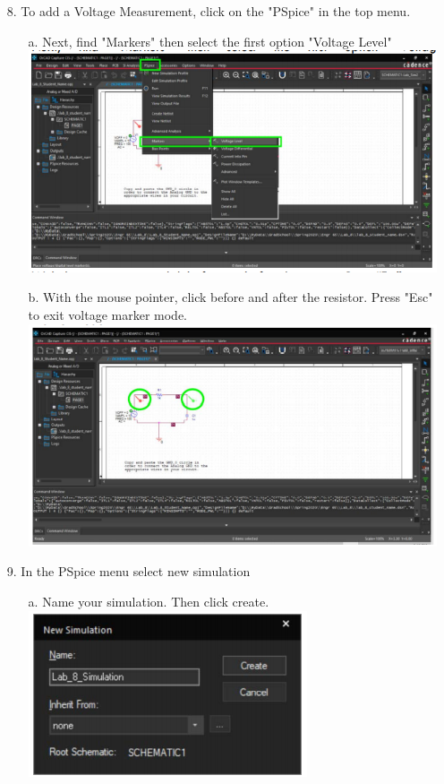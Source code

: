 \documentclass[a4paper]{article}
\begin{document}
\begin{itemize}
  \item[8.] To add a Voltage Measurement, click on the "PSpice" in the top menu.
  \begin{itemize}
    \item[a.] Next, find "Markers" then select the first option "Voltage Level" \\
    \includegraphics[scale=0.5]{12.png} \\ 
    \item[b.] With the mouse pointer, click before and after the resistor. Press "Esc" to exit voltage marker mode. \\
    \includegraphics[scale=0.5]{13.png} \\ 
  \end{itemize} 
  \item[9.] In the PSpice menu select new simulation
  \begin{itemize}
    \item[a.] Name your simulation. Then click create. \\
    \includegraphics[scale=0.5]{14.png} \\ 

\end{itemize}
\end{itemize}
\end{document}
